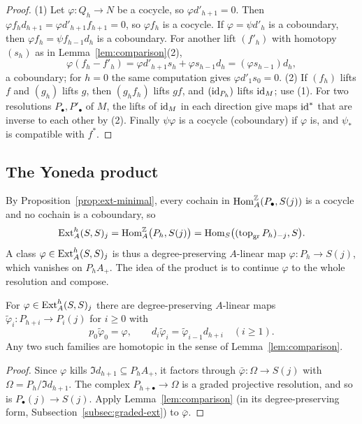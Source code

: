 \begin{proof}
(1) Let $\varphi:Q_h\to N$ be a cocycle, so $\varphi d'_{h+1}=0$.
Then $\varphi f_hd_{h+1}=\varphi d'_{h+1}f_{h+1}=0$, so $\varphi f_h$ is a cocycle.
If $\varphi=\psi d'_h$ is a coboundary, then $\varphi f_h=\psi f_{h-1}d_h$ is a coboundary.
For another lift $(f'_h)$ with homotopy $(s_h)$ as in Lemma~\ref{lem:comparison}(2),
\[
\varphi(f_h-f'_h)=\varphi d'_{h+1}s_h+\varphi s_{h-1}d_h=(\varphi s_{h-1})d_h,
\]
a coboundary; for $h=0$ the same computation gives $\varphi d'_1s_0=0$.
(2) If $(f_h)$ lifts $f$ and $(g_h)$ lifts $g$, then $(g_hf_h)$ lifts $gf$, and $(\operatorname{id}_{P_h})$ lifts $\operatorname{id}_M$; use (1).
For two resolutions $P_\bullet,P'_\bullet$ of $M$, the lifts of $\operatorname{id}_M$ in each direction give maps $\operatorname{id}^*$ that are inverse to each other by (2).
Finally $\psi\varphi$ is a cocycle (coboundary) if $\varphi$ is, and $\psi_*$ is compatible with $f^*$.
\end{proof}

\subsection{The Yoneda product}

By Proposition~\ref{prop:ext-minimal}, every cochain in $\operatorname{Hom}\nolimits_A^{\mathbb{Z}}(P_\bullet,S(j))$ is a cocycle and no cochain is a coboundary, so
\[
\operatorname{Ext}\nolimits_A^h(S,S)_j=\operatorname{Hom}\nolimits_A^{\mathbb{Z}}\bigl(P_h,S(j)\bigr)=\operatorname{Hom}\nolimits_S\bigl((\operatorname{top}\nolimits_{\mathrm{gr}} P_h)_{-j},S\bigr).
\]
A class $\varphi\in\operatorname{Ext}\nolimits_A^h(S,S)_j$ is thus a degree-preserving $A$-linear map $\varphi:P_h\to S(j)$, which vanishes on $P_hA_+$.
The idea of the product is to continue $\varphi$ to the whole resolution and compose.

\begin{lemma}\label{lem:yoneda-lift}
For $\varphi\in\operatorname{Ext}\nolimits_A^h(S,S)_j$ there are degree-preserving $A$-linear maps $\tilde\varphi_i:P_{h+i}\to P_i(j)$ for $i\geq0$ with
\[
p_0\tilde\varphi_0=\varphi,\qquad d_i\tilde\varphi_i=\tilde\varphi_{i-1}d_{h+i}\quad(i\geq1).
\]
Any two such families are homotopic in the sense of Lemma~\ref{lem:comparison}.
\end{lemma}

\begin{proof}
Since $\varphi$ kills $\Im d_{h+1}\subseteq P_hA_+$, it factors through $\bar\varphi:\Omega\to S(j)$ with $\Omega=P_h/\Im d_{h+1}$.
The complex $P_{h+\bullet}\to\Omega$ is a graded projective resolution, and so is $P_\bullet(j)\to S(j)$.
Apply Lemma~\ref{lem:comparison} (in its degree-preserving form, Subsection~\ref{subsec:graded-ext}) to $\bar\varphi$.
\end{proof}

